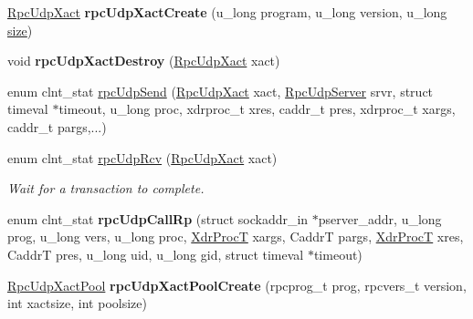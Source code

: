 \begin{DoxyCompactItemize}
\item 
\mbox{\label{group__rtems-nfsclient_ga35cc0975e13413fc428b6ef1bc721507}} 
\mbox{\hyperlink{structRpcUdpXactRec__}{Rpc\+Udp\+Xact}} {\bfseries rpc\+Udp\+Xact\+Create} (u\+\_\+long program, u\+\_\+long version, u\+\_\+long \mbox{\hyperlink{sun4u_2tte_8h_a245260f6f74972558f61b85227df5aae}{size}})
\item 
\mbox{\label{group__rtems-nfsclient_gaaf0c4c3bf95c419b6191486f49bfe23b}} 
void {\bfseries rpc\+Udp\+Xact\+Destroy} (\mbox{\hyperlink{structRpcUdpXactRec__}{Rpc\+Udp\+Xact}} xact)
\item 
enum clnt\+\_\+stat \mbox{\hyperlink{group__rtems-nfsclient_ga00b3bdde30fc2fd22e2682893a894b25}{rpc\+Udp\+Send}} (\mbox{\hyperlink{structRpcUdpXactRec__}{Rpc\+Udp\+Xact}} xact, \mbox{\hyperlink{structRpcUdpServerRec__}{Rpc\+Udp\+Server}} srvr, struct timeval $\ast$timeout, u\+\_\+long proc, xdrproc\+\_\+t xres, caddr\+\_\+t pres, xdrproc\+\_\+t xargs, caddr\+\_\+t pargs,...)
\item 
\mbox{\label{group__rtems-nfsclient_ga4490140cfcdd8411b086baa573d44ca6}} 
enum clnt\+\_\+stat \mbox{\hyperlink{group__rtems-nfsclient_ga4490140cfcdd8411b086baa573d44ca6}{rpc\+Udp\+Rcv}} (\mbox{\hyperlink{structRpcUdpXactRec__}{Rpc\+Udp\+Xact}} xact)
\begin{DoxyCompactList}\small\item\em Wait for a transaction to complete. \end{DoxyCompactList}\item 
\mbox{\label{group__rtems-nfsclient_ga5eaac63bdc58a61aecdf97c789139fcb}} 
enum clnt\+\_\+stat {\bfseries rpc\+Udp\+Call\+Rp} (struct sockaddr\+\_\+in $\ast$pserver\+\_\+addr, u\+\_\+long prog, u\+\_\+long vers, u\+\_\+long proc, \mbox{\hyperlink{group__rtems-nfsclient_gac22c99bf609cf4f3e1b601de1c157275}{Xdr\+ProcT}} xargs, CaddrT pargs, \mbox{\hyperlink{group__rtems-nfsclient_gac22c99bf609cf4f3e1b601de1c157275}{Xdr\+ProcT}} xres, CaddrT pres, u\+\_\+long uid, u\+\_\+long gid, struct timeval $\ast$timeout)
\item 
\mbox{\label{group__rtems-nfsclient_ga1ea52f547f9830e6c53c3b5e9048b7aa}} 
\mbox{\hyperlink{structRpcUdpXactPoolRec__}{Rpc\+Udp\+Xact\+Pool}} {\bfseries rpc\+Udp\+Xact\+Pool\+Create} (rpcprog\+\_\+t prog, rpcvers\+\_\+t version, int xactsize, int poolsize)

\end{DoxyCompactItemize}
